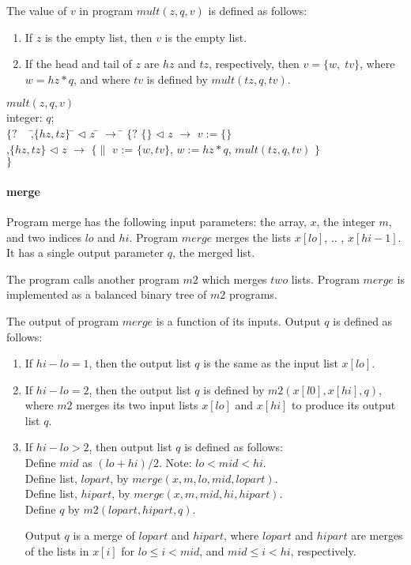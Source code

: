 The value of $v$ in program $mult(z,q,v)$ is defined as follows:
\begin{enumerate}
   \item If $z$ is the empty list, then $v$ is the empty list.
   \item If the head and tail of $z$ are $hz$ and $tz$, respectively, then
         $v = \{w, \; tv\}$, where 
         $w = hz*q$, and where $tv$  is defined by $mult(tz,q,tv)$.
\end{enumerate}

\begin{tabbing}
$mult(z,q,v)$ \\
integer: $q$;\\
$\{?$ $\; \;$ \= ,$\{ hz , tz \}$ \= $\lhd$ $z$ \= $\rightarrow$  \= \kill
$\{?$ 
\> $\{\}$ $\lhd$ $z$ \> \> $\rightarrow$ \>  $v := \{\}$ \\
\>,$\{ hz , tz \}$  $\lhd$ $z$ \> \>  $\rightarrow$ \>
$\{ \|$ $v$ := $\{ w , tv \}$, $w := hz*q$, $mult(tz,q,tv)$ $\}$\\
$\}$
\end{tabbing}

\paragraph{merge}
Program merge has the following input parameters: the array, 
$x$, the integer $m$, and two indices $lo$ and $hi$.  
Program $merge$ merges the
lists $x[lo]$, .. , $x[hi-1]$.  It has a single output parameter $q$,
the merged list.

The program calls another program $m2$ which merges $two$ lists. 
Program $merge$ is implemented as a balanced binary tree of $m2$ programs. 

The output of program $merge$ is a function of its inputs.
Output $q$ is defined as follows:
\begin{enumerate}
   \item If $hi-lo=1$, then the output list $q$ is the same as the input list
   $x[lo]$.
   \item If $hi-lo=2$, then the output list $q$ is defined by 
   $m2(x[l0],x[hi],q)$, where $m2$ merges its two input lists $x[lo]$ and
   $x[hi]$ to produce its output list $q$.
   \item If $hi-lo > 2$, then output list $q$ is defined as follows:\\
   Define $mid$ as $(lo+hi)/2$. Note: $lo < mid < hi$. \\
   Define list, $lopart$, by $merge(x,m,lo,mid,lopart)$. \\
   Define list, $hipart$, by $merge(x,m,mid,hi,hipart)$. \\
   Define $q$ by $m2(lopart,hipart,q)$. 
   
   Output $q$ is a merge of $lopart$ and
   $hipart$, where  $lopart$ and
   $hipart$ are merges of the lists in $x[i]$ for $lo \leq i < mid$,
   and $mid \leq i < hi$, respectively.
\end{enumerate}   


